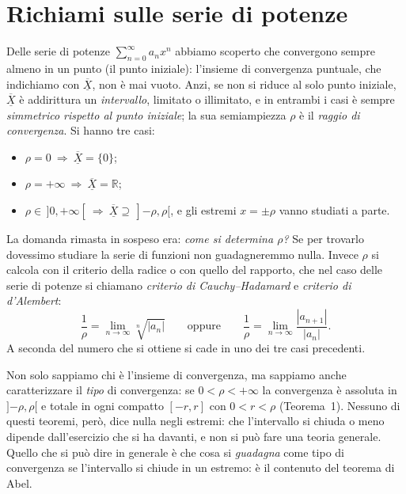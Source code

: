 \setcounter{figure}{13}

\section{Richiami sulle serie di potenze}

Delle serie di potenze $\sum_{n=0}^{\infty} a_n x^n$ abbiamo scoperto che convergono sempre almeno in un
punto (il punto iniziale): l'insieme di convergenza puntuale, che indichiamo con $\overline{\underline{X}}$, non è mai vuoto.
Anzi, se non si riduce al solo punto iniziale, $\overline{\underline{X}}$ è addirittura un \emph{intervallo}, limitato o illimitato, e
in entrambi i casi è sempre \emph{simmetrico rispetto al punto iniziale}; la sua semiampiezza $\rho$ è il
\emph{raggio di convergenza}. Si hanno tre casi:
\begin{itemize}
  \item $\rho = 0 \ \Rightarrow\ \overline{\underline{X}} = \{0\}$;
  \item $\rho = +\infty \ \Rightarrow\ \overline{\underline{X}} = \mathbb{R}$;
  \item $\rho \in \,]0,+\infty[ \ \Rightarrow\ \overline{\underline{X}} \supseteq \,]{-\rho},\rho[$, e gli estremi $x=\pm\rho$ vanno
        studiati a parte.
\end{itemize}

La domanda rimasta in sospeso era: \emph{come si determina $\rho$?}
Se per trovarlo dovessimo studiare la serie di funzioni non guadagneremmo nulla. Invece $\rho$ si calcola con il
criterio della radice o con quello del rapporto, che nel caso delle serie di potenze si chiamano
\emph{criterio di Cauchy--Hadamard} e \emph{criterio di d'Alembert}:
\[
  \frac{1}{\rho} = \lim_{n\to\infty} \sqrt[n]{|a_n|}
  \qquad\text{oppure}\qquad
  \frac{1}{\rho} = \lim_{n\to\infty} \frac{|a_{n+1}|}{|a_n|} .
\]
A seconda del numero che si ottiene si cade in uno dei tre casi precedenti.

Non solo sappiamo chi è l'insieme di convergenza, ma sappiamo anche caratterizzare il \emph{tipo} di
convergenza: se $0<\rho<+\infty$ la convergenza è assoluta in $]{-\rho},\rho[$ e totale in ogni compatto
$[-r,r]$ con $0<r<\rho$ (Teorema~1). Nessuno di questi teoremi, però, dice nulla negli estremi: che l'intervallo
si chiuda o meno dipende dall'esercizio che si ha davanti, e non si può fare una teoria generale. Quello che si
può dire in generale è che cosa si \emph{guadagna} come tipo di convergenza se l'intervallo si chiude in un
estremo: è il contenuto del teorema di Abel.

